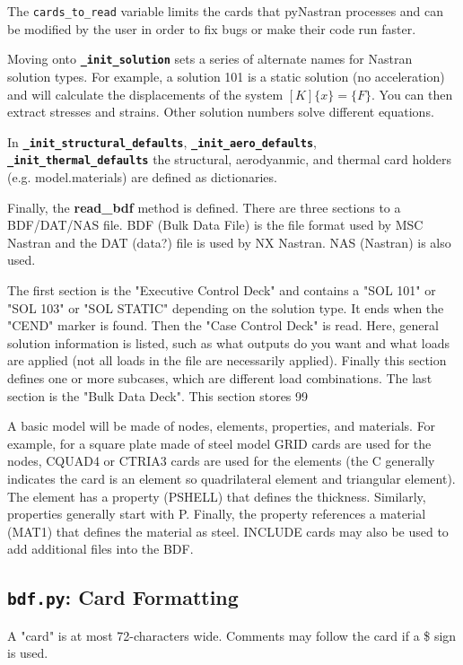      The {\tt cards_to_read} variable limits the cards that pyNastran processes and can be modified by the user in order to fix bugs or make their code run faster.
     
     Moving onto {\bf \tt \_init\_solution} sets a series of alternate names for Nastran solution types.  For example, a solution 101 is a static solution (no acceleration) and will calculate the displacements of the system $[K]\{x\} = \{F\} $.  You can then extract stresses and strains.  Other solution numbers solve different equations.
     
     In {\bf \tt \_init\_structural\_defaults}, {\bf \tt \_init\_aero\_defaults}, {\bf \tt \_init\_thermal\_defaults} the structural, aerodyanmic, and thermal card holders (e.g. model.materials) are defined as dictionaries.

     Finally, the {\bf read_bdf} method is defined.  There are three sections to a BDF/DAT/NAS file.  BDF (Bulk Data File) is the file format used by MSC Nastran and the DAT (data?) file is used by NX Nastran.  NAS (Nastran) is also used.

     The first section is the "Executive Control Deck" and contains a "SOL 101" or "SOL 103" or "SOL STATIC" depending on the solution type.  It ends when the "CEND" marker is found. Then the "Case Control Deck" is read.  Here, general solution information is listed, such  as what outputs do you want and what loads are applied (not all loads in the file are necessarily applied).  Finally this section defines one or more subcases, which are different load combinations.  The last section is the "Bulk Data Deck".  This section stores 99%
     
     A basic model will be made of nodes, elements, properties, and materials.  For example, for a square plate made of steel model GRID cards are used for the nodes, CQUAD4 or CTRIA3 cards are used for the elements (the C generally indicates the card is an element so quadrilateral element and triangular element).  The element has a property (PSHELL) that defines the thickness.  Similarly, properties generally start with P.  Finally,  the property references a material (MAT1) that defines the material as steel.  INCLUDE cards may also be used to add additional files into the BDF.
     
 \subsection{{\tt bdf.py}: Card Formatting}
     A "card" is at most 72-characters wide.  Comments may follow the card if a \$ sign is used.
     
